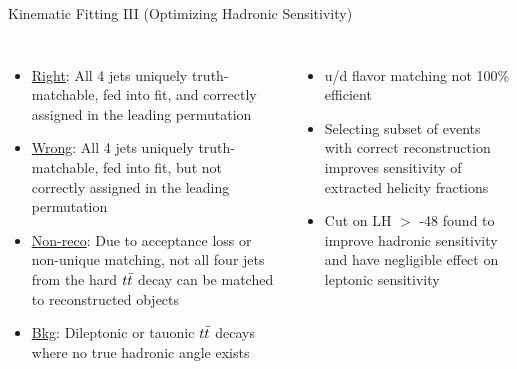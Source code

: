 \documentclass{beamer}
\newcommand*{\ttbar}{\ensuremath{\lowercase{t\bar{t}}}\xspace}
\begin{document}
{\begin{frame}{Kinematic Fitting III (Optimizing Hadronic Sensitivity)}
\begin{columns}
\begin{itemize}
      \item \underline{Right}: All 4 jets uniquely truth-matchable, fed into fit, and correctly assigned in the leading permutation
      \item \underline{Wrong}: All 4 jets uniquely truth-matchable, fed into fit, but not correctly assigned in the leading permutation
      \item \underline{Non-reco}: Due to acceptance loss or non-unique matching, not all four jets from the hard \ttbar decay can  be matched to reconstructed objects
      \item \underline{Bkg}: Dileptonic or tauonic \ttbar decays where no true hadronic angle exists
      \end{itemize}
    \begin{itemize}\small
      \item u/d flavor matching not 100\% efficient
      \item Selecting subset of events with correct reconstruction improves sensitivity of extracted helicity fractions
      \item Cut on LH $>$ -48 found to improve hadronic sensitivity and have negligible effect on leptonic sensitivity
    \end{itemize}
    \end{columns}
  \end{frame}

}
\end{document}
